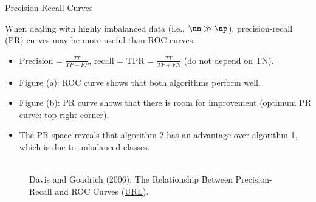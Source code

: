 \documentclass[11pt,compress,t,notes=noshow, xcolor=table]{beamer}
\begin{document}
\begin{vbframe}{Precision-Recall Curves}


\begin{footnotesize}

When dealing with highly imbalanced data (i.e., $\nn \gg \np$), precision-recall 
(PR) curves may be more useful than ROC curves:

\begin{itemize}
  \item Precision = $\frac{TP}{TP + FP}$, recall = TPR = $\frac{TP}{TP + FN}$ 
  (do not depend on TN).
  \item Figure (a): ROC curve shows that both algorithms perform well.
  \item Figure (b): PR curve shows that there is room for improvement (optimum 
  PR curve: top-right corner).
  \item The PR space reveals that algorithm 2 has an advantage over algorithm 1, 
  which is due to imbalanced classes.
\end{itemize}

\end{footnotesize}

\begin{figure}
  \centering
  \tiny
  \\Davis and Goadrich (2006): The Relationship Between Precision-Recall and 
  ROC Curves (\href{https://www.biostat.wisc.edu/~page/rocpr.pdf}
  {\underline{URL}}).
\end{figure}


\end{vbframe}
\end{document}
